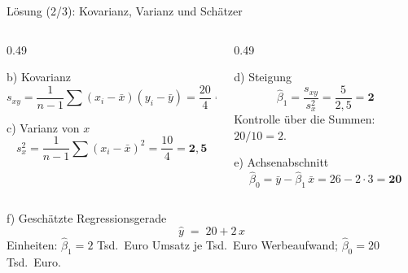 \documentclass[aspectratio=169,11pt]{beamer}
\begin{document}
\begin{frame}{Lösung (2/3): Kovarianz, Varianz und Schätzer}
  \begin{columns}[T]
    \begin{column}{0.49\textwidth}
      \begin{block}{b) Kovarianz}
        \[
          s_{xy} = \frac{1}{n-1}\sum (x_i-\bar{x})(y_i-\bar{y}) = \frac{20}{4} = \mathbf{5}
        \]
      \end{block}
      \begin{block}{c) Varianz von $x$}
        \[
          s_x^{2} = \frac{1}{n-1}\sum (x_i-\bar{x})^{2} = \frac{10}{4} = \mathbf{2{,}5}
        \]
      \end{block}
    \end{column}
    \begin{column}{0.49\textwidth}
      \begin{block}{d) Steigung}
        \[
          \hat{\beta}_1 = \frac{s_{xy}}{s_x^{2}} = \frac{5}{2{,}5} = \mathbf{2}
        \]
        Kontrolle über die Summen: $20/10 = 2$.
      \end{block}
      \begin{block}{e) Achsenabschnitt}
        \[
          \hat{\beta}_0 = \bar{y} - \hat{\beta}_1\,\bar{x} = 26 - 2\cdot 3 = \mathbf{20}
        \]
      \end{block}
    \end{column}
  \end{columns}

  \begin{exampleblock}{f) Geschätzte Regressionsgerade}
    \[
      \hat{y} \;=\; 20 + 2\,x
    \]
    Einheiten: $\hat{\beta}_1 = 2$ Tsd.\ Euro Umsatz je Tsd.\ Euro Werbeaufwand;
    $\hat{\beta}_0 = 20$ Tsd.\ Euro.
  \end{exampleblock}
\end{frame}
\end{document}
